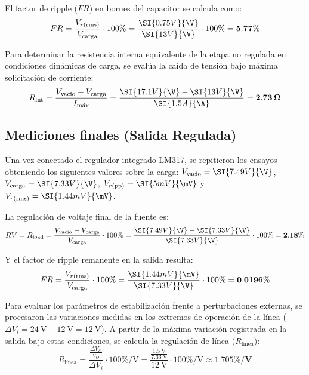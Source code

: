 \documentclass[12pt,a4paper]{article}
\begin{document}
El factor de ripple ($FR$) en bornes del capacitor se calcula como:
\begin{equation}
    FR = \frac{V_{r(\text{rms})}}{V_{\text{carga}}} \cdot 100\% = \frac{\SI{0.75 V}{\V}}{\SI{13 V}{\V}} \cdot 100\% = \mathbf{5.77\%}
\end{equation}

Para determinar la resistencia interna equivalente de la etapa no regulada en condiciones dinámicas de carga, se evalúa la caída de tensión bajo máxima solicitación de corriente:
\begin{equation}
    R_{\text{int}} = \frac{V_{\text{vacio}} - V_{\text{carga}}}{I_{\text{máx}}} = \frac{\SI{17.1 V}{\V} - \SI{13 V}{\V}}{\SI{1.5 A}{\A}} = \mathbf{2.73\,\Omega}
\end{equation}

\subsection{Mediciones finales (Salida Regulada)}
Una vez conectado el regulador integrado LM317, se repitieron los ensayos obteniendo los siguientes valores sobre la carga: $V_{\text{vacio}} = \SI{7.49V}{\V}$, $V_{\text{carga}} = \SI{7.33V}{\V}$, $V_{r(\text{pp})} = \SI{5mV}{\mV}$ y $V_{r(\text{rms})} = \SI{1.44mV}{\mV}$. 

La regulación de voltaje final de la fuente es:
\begin{equation}
    RV = R_{\text{load}} = \frac{V_{\text{vacio}} - V_{\text{carga}}}{V_{\text{carga}}} \cdot 100\% = \frac{\SI{7.49V}{\V} - \SI{7.33V}{\V}}{\SI{7.33V}{\V}} \cdot 100\% = \mathbf{2.18\%}
\end{equation}

Y el factor de ripple remanente en la salida resulta:
\begin{equation}
    FR = \frac{V_{r(\text{rms})}}{V_{\text{carga}}} \cdot 100\% = \frac{\SI{1.44mV}{\mV}}{\SI{7.33V}{\V}} \cdot 100\% = \mathbf{0.0196\%}
\end{equation}

Para evaluar los parámetros de estabilización frente a perturbaciones externas, se procesaron las variaciones medidas en los extremos de operación de la línea ($\Delta V_i = \SI{24}{\V} - \SI{12}{\V} = \SI{12}{\V}$). A partir de la máxima variación registrada en la salida bajo estas condiciones, se calcula la regulación de línea ($R_{\text{línea}}$):
\begin{equation}
    R_{\text{línea}} = \frac{\frac{\Delta V_O}{V_O}}{\Delta V_i} \cdot 100\%/\text{V} = \frac{\frac{\SI{1.5}{\V}}{\SI{7.33}{\V}}}{\SI{12}{\V}} \cdot 100\%/\text{V} \approx \mathbf{1.705\%/\text{V}}
\end{equation}
\end{document}
